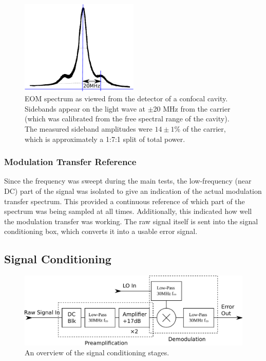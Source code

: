 \begin{figure}
  \centering\includegraphics[width=0.5\textwidth]{figures/eom_wave.pdf}
  \caption[EOM spectrum]{EOM spectrum as viewed from the detector of a confocal cavity.  Sidebands appear on the light wave at $\pm$20 MHz from the carrier (which was calibrated from the free spectral range of the cavity). The measured sideband amplitudes were $14\pm1$\% of the carrier, which is approximately a 1:7:1 split of total power.}
  \label{fig:eom_wave}
\end{figure}

    \subsubsection{Modulation Transfer Reference}

Since the frequency was sweept during the main tests, the low-frequency (near DC) part of the signal was isolated to give an indication of the actual modulation transfer spectrum.  This provided a continuous reference of which part of the spectrum was being sampled at all times. Additionally, this indicated how well the modulation transfer was working. The raw signal itself is sent into the signal conditioning box, which converts it into a usable error signal. \\

\subsection{Signal Conditioning}
\label{sec:signalcond}

\begin{figure}
  \centering\includegraphics[width=\textwidth]{figures/rf_design.pdf}
  \caption{An overview of the signal conditioning stages.}
  \label{fig:rf_design}
\end{figure}


